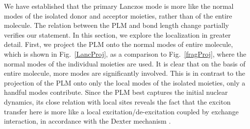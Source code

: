 We have established  that the primary Lanczos mode is more like the normal modes of the isolated
donor and acceptor moieties, rather than of the entire molecule. The relation between the
PLM and bond length change partially verifies our statement.
In this section, we explore  the localization in greater detail.
First, we project the PLM onto the normal modes of entire molecule,
which is shown in Fig.~\ref{LancProj}, as a comparison to Fig.~\ref{fragProj}, where the normal modes of the individual moieties are used.    It is clear that on the basis of entire molecule, more modes are significantly involved.   This is in contrast to the projection of the PLM onto only the local modes of the isolated moieties, only a handful modes contribute.  Since the PLM  best captures the initial nuclear dynamics,
 its close relation with local sites reveals the fact that the exciton transfer here is more like a local excitation/de-excitation
coupled by exchange interaction,  in accordance with the Dexter mechanism \cite{dexter1953theory}.


